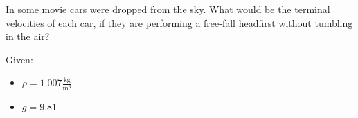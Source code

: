 
In some movie cars were dropped from the sky.
What would be the terminal velocities of each car, if they are
performing a free-fall headfirst without tumbling in the air?

\bigbreak Given:
\begin{itemize}
    \item $\rho = 1.007 \frac{\text{kg}}{\text{m}^3}$
    \item $ g = 9.81 $
\end{itemize}
